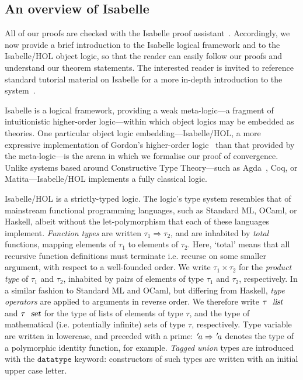 \documentclass[acmlarge,review,anonymous]{acmart}\settopmatter{printfolios=true}
\begin{document}



\subsection{An overview of Isabelle}
\label{subsect.an.overview.of.isabelle}

All of our proofs are checked with the Isabelle proof assistant~\cite{DBLP:conf/tphol/WenzelPN08}.
Accordingly, we now provide a brief introduction to the Isabelle logical framework and to the Isabelle/HOL object logic, so that the reader can easily follow our proofs and understand our theorem statements.
The interested reader is invited to reference standard tutorial material on Isabelle for a more in-depth introduction to the system~\cite{DBLP:books/sp/NipkowK14}.

Isabelle is a logical framework, providing a weak meta-logic---a fragment of intuitionistic higher-order logic---within which object logics may be embedded as theories.
One particular object logic embedding---Isabelle/HOL, a more expressive implementation of Gordon's higher-order logic~\cite{DBLP:conf/tphol/Gordon91} than that provided by the meta-logic---is the arena in which we formalise our proof of convergence.
Unlike systems based around Constructive Type Theory---such as Agda~\cite{DBLP:conf/tphol/BoveDN09}, Coq, or Matita---Isabelle/HOL implements a fully classical logic.


Isabelle/HOL is a strictly-typed logic.
The logic's type system resembles that of mainstream functional programming languages, such as Standard ML, OCaml, or Haskell, albeit without the let-polymorphism that each of these languages implement.
\emph{Function types} are written $\tau_1 \Rightarrow \tau_2$, and are inhabited by \emph{total} functions, mapping elements of $\tau_1$ to elements of $\tau_2$.
Here, `total' means that all recursive function definitions must terminate i.e. recurse on some smaller argument, with respect to a well-founded order.
We write $\tau_1 \times \tau_2$ for the \emph{product type} of $\tau_1$ and $\tau_2$, inhabited by pairs of elements of type $\tau_1$ and $\tau_2$, respectively.
In a similar fashion to Standard ML and OCaml, but differing from Haskell, \emph{type operators} are applied to arguments in reverse order.
We therefore write $\tau\ \isa{list}$ and $\tau\ \isa{set}$ for the type of lists of elements of type $\tau$, and the type of mathematical (i.e. potentially infinite) sets of type $\tau$, respectively.
Type variable are written in lowercase, and preceded with a prime: ${\emph{$\mskip2mu{'}\mskip-2mu$}}a \Rightarrow {\emph{$\mskip2mu{'}\mskip-2mu$}}a$ denotes the type of a polymorphic identity function, for example.
\emph{Tagged union} types are introduced with the $\mathtt{datatype}$ keyword: constructors of such types are written with an initial upper case letter.
\end{document}
